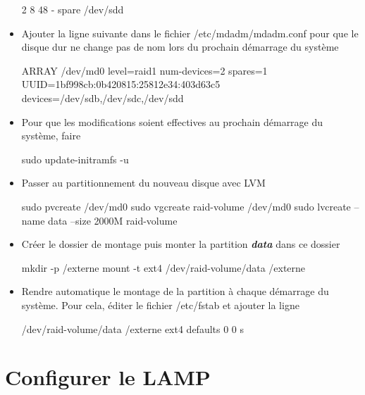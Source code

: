 \documentclass[a4paper,12pt,french]{report} %
\begin{document}
\begin{itemize}
\begin{exempleConsole}
			   2       8       48        -      spare   /dev/sdd
		
	\end{exempleConsole}
	\item  Ajouter la ligne suivante dans le fichier /etc/mdadm/mdadm.conf pour que le disque dur ne change pas de nom lors du prochain démarrage du système 
	\begin{exempleConsole}
	ARRAY /dev/md0 level=raid1 num-devices=2 spares=1 UUID=1bf998cb:0b420815:25812e34:403d63c5 devices=/dev/sdb,/dev/sdc,/dev/sdd
	\end{exempleConsole}
	\item Pour que les modifications soient effectives au prochain démarrage du système, faire
	\begin{exempleConsole}
	sudo update-initramfs -u
	\end{exempleConsole}
	\item Passer au partitionnement du nouveau disque avec LVM
	\begin{exempleConsole}
	sudo pvcreate /dev/md0
	sudo vgcreate raid-volume /dev/md0 
	sudo lvcreate --name data --size 2000M raid-volume
	\end{exempleConsole}
	\item Créer le dossier de montage puis monter la partition \emph{\textbf{data}} dans ce dossier 
	\begin{exempleConsole}
	mkdir -p /externe
	mount -t ext4 /dev/raid-volume/data /externe
	\end{exempleConsole}
	\item Rendre automatique le montage de la partition à chaque démarrage du système. Pour cela, éditer le fichier /etc/fstab et ajouter la ligne
	\begin{exempleConsole}
	/dev/raid-volume/data /externe ext4 defaults 0 0
	s\end{exempleConsole}
\end{itemize} 
\section{Configurer le LAMP}
\end{document}

